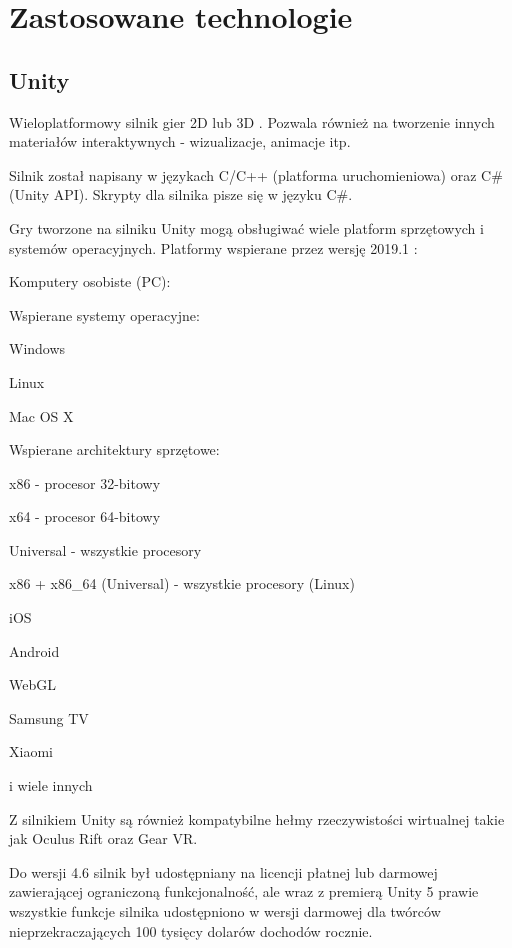 \chapter{Zastosowane technologie}
\section{Unity}
Wieloplatformowy silnik gier 2D lub 3D \cite{unity:opis}. Pozwala również na tworzenie innych materiałów interaktywnych - wizualizacje, animacje itp.

Silnik został napisany w językach C/C++ (platforma uruchomieniowa) oraz C\# (Unity API). 
Skrypty dla silnika pisze się w języku C\#.

Gry tworzone na silniku Unity mogą obsługiwać wiele platform sprzętowych i systemów operacyjnych. 
Platformy wspierane przez wersję 2019.1 \cite{unity:buildOptions}:
\begin{enumerate*}
\item Komputery osobiste (PC):
\begin{enumerate*}
\item Wspierane systemy operacyjne:
\begin{itemize*}
\item Windows
\item Linux
\item Mac OS X
\end{itemize*}
\item Wspierane architektury sprzętowe:
\begin{itemize*}
\item x86 - procesor 32-bitowy
\item x64 - procesor 64-bitowy
\item Universal - wszystkie procesory
\item x86 + x86\_64 (Universal) - wszystkie procesory (Linux)
\end{itemize*}
\end{enumerate*}
\item iOS
\item Android
\item WebGL
\item Samsung TV
\item Xiaomi
\item i wiele innych
\end{enumerate*}

Z silnikiem Unity są również kompatybilne hełmy rzeczywistości wirtualnej takie jak Oculus Rift oraz Gear VR.

Do wersji 4.6 silnik był udostępniany na licencji płatnej lub darmowej zawierającej ograniczoną funkcjonalność, ale wraz z premierą Unity 5 prawie wszystkie funkcje silnika udostępniono w wersji darmowej dla twórców nieprzekraczających 100 tysięcy dolarów dochodów rocznie.

